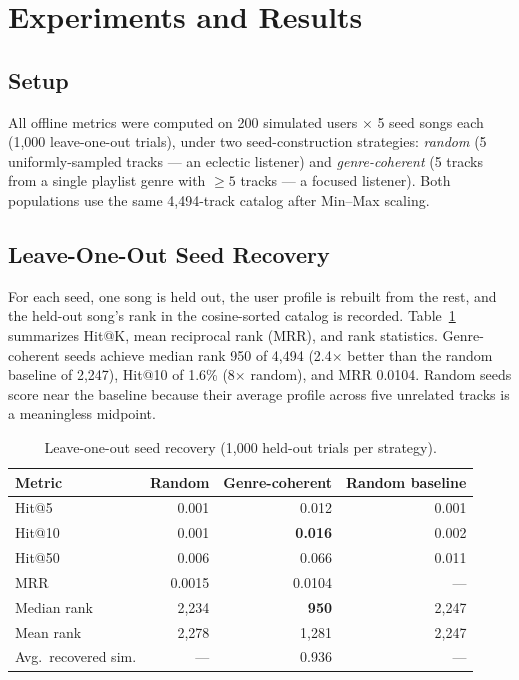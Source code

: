 \documentclass[letterpaper, 10 pt, conference]{ieeeconf}
\begin{document}
\section{Experiments and Results}

\subsection{Setup}

All offline metrics were computed on 200 simulated users $\times$ 5 seed songs each (1{,}000 leave-one-out trials), under two seed-construction strategies: \emph{random} (5 uniformly-sampled tracks --- an eclectic listener) and \emph{genre-coherent} (5 tracks from a single playlist genre with $\geq 5$ tracks --- a focused listener). Both populations use the same 4{,}494-track catalog after Min--Max scaling.

\subsection{Leave-One-Out Seed Recovery}

For each seed, one song is held out, the user profile is rebuilt from the rest, and the held-out song's rank in the cosine-sorted catalog is recorded. Table~\ref{tab:loo} summarizes Hit@K, mean reciprocal rank (MRR), and rank statistics. Genre-coherent seeds achieve median rank 950 of 4{,}494 (2.4$\times$ better than the random baseline of 2{,}247), Hit@10 of 1.6\% (8$\times$ random), and MRR 0.0104. Random seeds score near the baseline because their average profile across five unrelated tracks is a meaningless midpoint.

\begin{table}[h]
\centering
\caption{Leave-one-out seed recovery (1{,}000 held-out trials per strategy).}
\label{tab:loo}
\begin{tabular}{lrrr}
\toprule
Metric & Random & Genre-coherent & Random baseline \\
\midrule
Hit@5 & 0.001 & 0.012 & 0.001 \\
Hit@10 & 0.001 & \textbf{0.016} & 0.002 \\
Hit@50 & 0.006 & 0.066 & 0.011 \\
MRR & 0.0015 & 0.0104 & --- \\
Median rank & 2{,}234 & \textbf{950} & 2{,}247 \\
Mean rank & 2{,}278 & 1{,}281 & 2{,}247 \\
Avg.\ recovered sim. & --- & 0.936 & --- \\
\bottomrule
\end{tabular}
\end{table}
\end{document}
